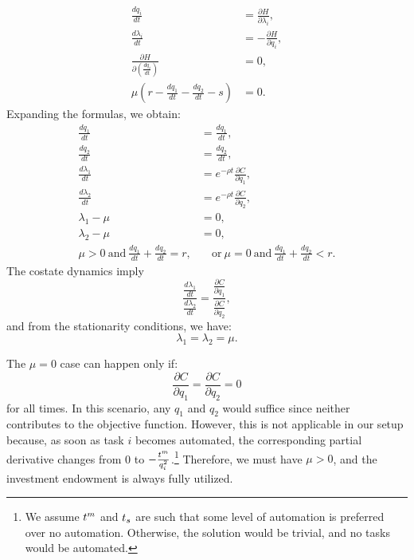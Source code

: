 \documentclass{article}
\theoremstyle{plain}
\theoremstyle{plain}
\begin{document}
\begin{align*}
\frac{dq_{i}}{dt} & =\frac{\partial H}{\partial\lambda_{i}},\tag{State Dynamics}\\[1ex]
\frac{d\lambda_{i}}{dt} & =-\frac{\partial H}{\partial q_{i}},\tag{Costate Dynamics}\\[1ex]
\frac{\partial H}{\partial\left(\frac{dq_{i}}{dt}\right)} & =0,\tag{Stationarity}\\[1ex]
\mu\left(r-\frac{dq_{1}}{dt}-\frac{dq_{2}}{dt}-s\right) & =0.\tag{Complementary Slackness}
\end{align*}
Expanding the formulas, we obtain:
\begin{align*}
\frac{dq_{1}}{dt} & =\frac{dq_{1}}{dt},\\[1ex]
\frac{dq_{2}}{dt} & =\frac{dq_{2}}{dt},\\[1ex]
\frac{d\lambda_{1}}{dt} & =e^{-\rho t}\frac{\partial C}{\partial q_{1}},\\[1ex]
\frac{d\lambda_{2}}{dt} & =e^{-\rho t}\frac{\partial C}{\partial q_{2}},\\[1ex]
\lambda_{1}-\mu & =0,\\[1ex]
\lambda_{2}-\mu & =0,\\[1ex]
\mu>0\ \text{and}\ \frac{dq_{1}}{dt}+\frac{dq_{2}}{dt}=r, & \quad \text{or}\ \mu=0\ \text{and}\ \frac{dq_{1}}{dt}+\frac{dq_{2}}{dt}<r.
\end{align*}
The costate dynamics imply
\[
\frac{\frac{d\lambda_{1}}{dt}}{\frac{d\lambda_{2}}{dt}}=\frac{\frac{\partial C}{\partial q_{1}}}{\frac{\partial C}{\partial q_{2}}},
\]
and from the stationarity conditions, we have:
\[
\lambda_{1}=\lambda_{2}=\mu.
\]

The $\mu=0$ case can happen only if:
\[
\frac{\partial C}{\partial q_{1}}=\frac{\partial C}{\partial q_{2}}=0
\]
for all times.  
In this scenario, any $q_{1}$ and $q_{2}$ would suffice since neither contributes to the objective function.  
However, this is not applicable in our setup because, as soon as task $i$ becomes automated, the corresponding partial derivative changes from 0 to $-\frac{t^{m}_{}}{q_{i}^{2}}$.\footnote{We assume $t^{m}_{}$ and $t_{s}$ are such that some level of automation is preferred over no automation.  
Otherwise, the solution would be trivial, and no tasks would be automated.}  
Therefore, we must have $\mu>0$, and the investment endowment is always fully utilized.
\end{document}
